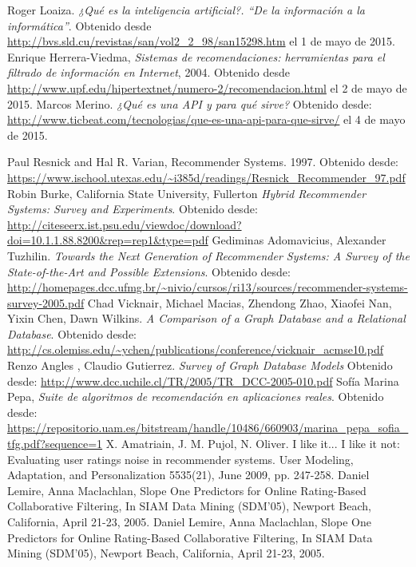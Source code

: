\begin{thebibliography}{99}
    Roger Loaiza. \emph{¿Qué es la inteligencia artificial?. “De la información a la informática”}. Obtenido desde \url{http://bvs.sld.cu/revistas/san/vol2_2_98/san15298.htm} el 1 de mayo de 2015.
    Enrique Herrera-Viedma, \emph{Sistemas de recomendaciones: herramientas para el filtrado de información en Internet}, 2004. Obtenido desde \url{http://www.upf.edu/hipertextnet/numero-2/recomendacion.html} el 2 de mayo de 2015. 
     Marcos Merino. \emph{¿Qué es una API y para qué sirve?} Obtenido desde: \url{http://www.ticbeat.com/tecnologias/que-es-una-api-para-que-sirve/} el 4 de mayo de 2015. 

    Paul Resnick and Hal R. Varian, Recommender Systems. 1997. Obtenido desde: \url{https://www.ischool.utexas.edu/~i385d/readings/Resnick_Recommender_97.pdf}
    Robin Burke, California State University, Fullerton \emph{Hybrid Recommender Systems: Survey and Experiments}. Obtenido desde: \url{http://citeseerx.ist.psu.edu/viewdoc/download?doi=10.1.1.88.8200\&rep=rep1\&type=pdf}
    Gediminas Adomavicius, Alexander Tuzhilin. \emph{Towards the Next Generation of Recommender Systems: A Survey of the State-of-the-Art and Possible Extensions}. Obtenido desde: \url{http://homepages.dcc.ufmg.br/~nivio/cursos/ri13/sources/recommender-systems-survey-2005.pdf}
    Chad Vicknair, Michael Macias, Zhendong Zhao, Xiaofei Nan, Yixin Chen, Dawn Wilkins. \emph{A Comparison of a Graph Database and a Relational Database}. Obtenido desde: \url{http://cs.olemiss.edu/~ychen/publications/conference/vicknair_acmse10.pdf}
    Renzo Angles , Claudio Gutierrez. \emph{Survey of Graph Database Models} Obtenido desde: \url{http://www.dcc.uchile.cl/TR/2005/TR_DCC-2005-010.pdf}
    Sofía Marina Pepa, \emph{Suite de algoritmos de recomendación en aplicaciones reales}. Obtenido desde: \url{https://repositorio.uam.es/bitstream/handle/10486/660903/marina_pepa_sofia_tfg.pdf?sequence=1}
   X. Amatriain, J. M. Pujol, N. Oliver. I like it... I like it not: Evaluating user ratings noise in recommender systems. User Modeling, Adaptation, and Personalization 5535(21), June 2009, pp. 247-258.
   Daniel Lemire, Anna Maclachlan, Slope One Predictors for Online Rating-Based Collaborative Filtering, In SIAM Data Mining (SDM'05), Newport Beach, California, April 21-23, 2005.
   Daniel Lemire, Anna Maclachlan, Slope One Predictors for Online Rating-Based Collaborative Filtering, In SIAM Data Mining (SDM'05), Newport Beach, California, April 21-23, 2005.

\end{thebibliography}
